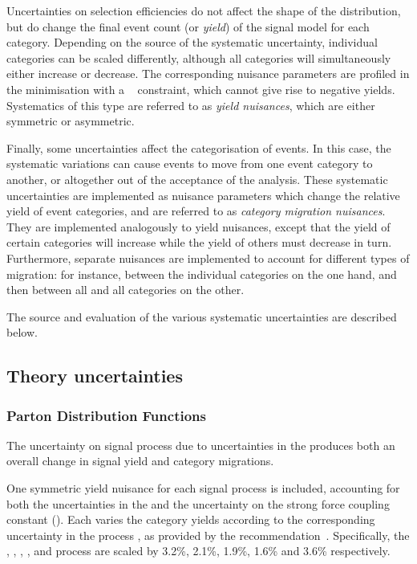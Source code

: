Uncertainties on selection efficiencies do not affect the shape of the \mgg distribution, but do change the final event count (or \emph{yield}) of the signal model for each category. Depending on the source of the systematic uncertainty, individual categories can be scaled differently, although all categories will simultaneously either increase or decrease. The corresponding nuisance parameters are profiled in the \NLL minimisation with a \lnN~\cite{1987lognormal} constraint, which cannot give rise to negative yields. Systematics of this type are referred to as \emph{yield nuisances}, which are either symmetric or asymmetric. %

Finally, some uncertainties affect the categorisation of events. In this case, the systematic variations can cause events to move from one event category to another, or altogether out of the acceptance of the analysis. These systematic uncertainties are implemented as nuisance parameters which change the relative yield of event categories, and are referred to as \emph{category migration nuisances}. They are implemented analogously to yield nuisances, except that the yield of certain categories will increase while the yield of others must decrease in turn. Furthermore, separate nuisances are implemented to account for different types of migration: for instance, between the individual \VBFTag categories on the one hand, and then between all \VBFTag and all \Untagged categories on the other.

The source and evaluation of the various systematic uncertainties are described below.

\subsection{Theory uncertainties}
\subsubsection{Parton Distribution Functions}

The uncertainty on signal process \crosssection\s due to uncertainties in the \PDF produces both an overall change in signal yield and category migrations.

One symmetric yield nuisance for each signal process is included, accounting for both the uncertainties in the \PDF\s and the uncertainty on the strong force coupling constant (\alphaS). Each varies the category yields according to the corresponding uncertainty in the process \crosssection, as provided by the \LHCHXSWG recommendation~\cite{LHCHXSWGYR4}. Specifically, the \ggH, \VBF, \WH, \ZH, and \ttH process \crosssection\s are scaled by 3.2\%, 2.1\%, 1.9\%, 1.6\% and 3.6\% respectively. 

